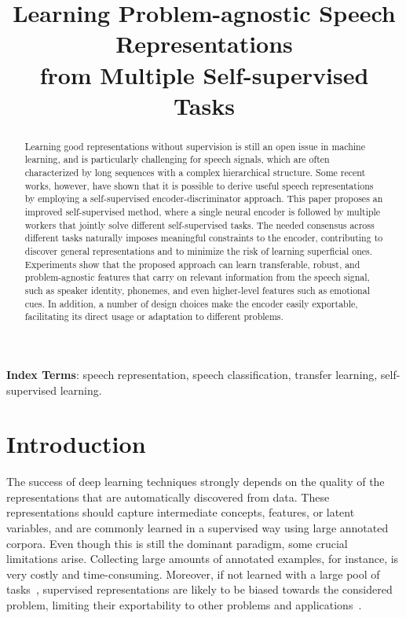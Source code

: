 \documentclass[a4paper]{article}
\title{Learning Problem-agnostic Speech Representations\\ from Multiple Self-supervised Tasks}
\begin{document}
\maketitle
\begin{abstract}
Learning good representations without supervision is still an open issue in machine learning, and is particularly challenging for speech signals, which are often characterized by long sequences with a complex hierarchical structure. Some recent works, however, have shown that it is possible to derive useful speech representations by employing a self-supervised encoder-discriminator approach. This paper proposes an improved self-supervised method, where a single neural encoder is followed by multiple workers that jointly solve different self-supervised tasks. The needed consensus across different tasks naturally imposes meaningful constraints to the encoder, contributing to discover general representations and to minimize the risk of learning superficial ones. Experiments show that the proposed approach can learn transferable, robust, and problem-agnostic features that carry on relevant information from the speech signal, such as speaker identity, phonemes, and even higher-level features such as emotional cues. In addition, a number of design choices make the encoder easily exportable, facilitating its direct usage or adaptation to different problems.
\end{abstract}
\noindent\textbf{Index Terms}: speech representation, speech classification, transfer learning, self-supervised learning.

\section{Introduction}


The success of deep learning techniques strongly depends on the quality of the representations that are automatically discovered from data. 
These representations should capture intermediate concepts, features, or latent variables, and are commonly learned in a supervised way using large annotated corpora. Even though this is still the dominant paradigm, some crucial limitations arise. Collecting large amounts of annotated examples, for instance, is very costly and time-consuming.
Moreover, if not learned with a large pool of tasks~\cite{Serra18AIRD}, supervised representations are likely to be biased towards the considered problem, limiting their exportability to other problems and applications~\cite{transfer_learning}.
\end{document}
